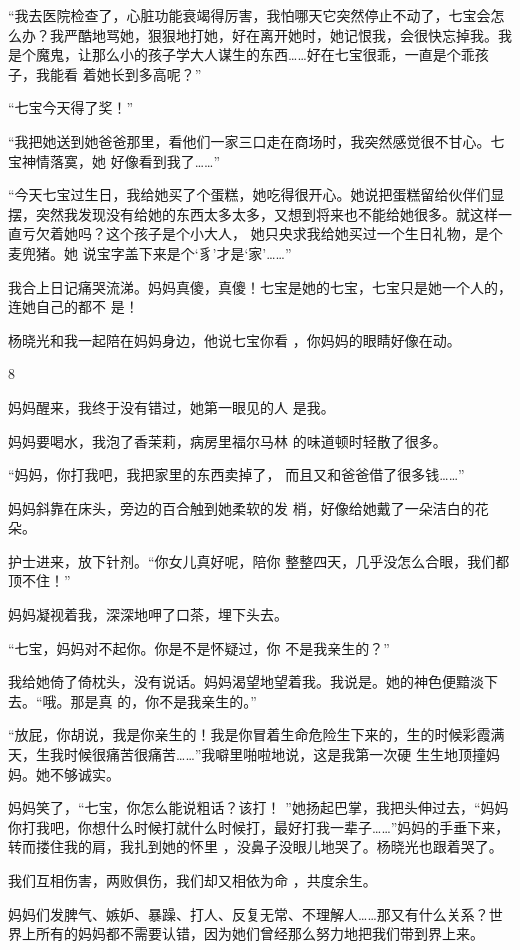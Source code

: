 \documentclass{article}
\begin{document}
“我去医院检查了，心脏功能衰竭得厉害，我怕哪天它突然停止不动了，七宝会怎么办？我严酷地骂她，狠狠地打她，好在离开她时，她记恨我，会很快忘掉我。我是个魔鬼，让那么小的孩子学大人谋生的东西……好在七宝很乖，一直是个乖孩子，我能看
着她长到多高呢？” 


“七宝今天得了奖！” 

“我把她送到她爸爸那里，看他们一家三口走在商场时，我突然感觉很不甘心。七宝神情落寞，她
好像看到我了……” 

“今天七宝过生日，我给她买了个蛋糕，她吃得很开心。她说把蛋糕留给伙伴们显摆，突然我发现没有给她的东西太多太多，又想到将来也不能给她很多。就这样一直亏欠着她吗？这个孩子是个小大人，
\newpage
她只央求我给她买过一个生日礼物，是个麦兜猪。她
说宝字盖下来是个‘豸’才是‘家’……” 

我合上日记痛哭流涕。妈妈真傻，真傻！七宝是她的七宝，七宝只是她一个人的，连她自己的都不
是！ 

杨晓光和我一起陪在妈妈身边，他说七宝你看
，你妈妈的眼睛好像在动。 


8 

妈妈醒来，我终于没有错过，她第一眼见的人
是我。 

妈妈要喝水，我泡了香茉莉，病房里福尔马林
的味道顿时轻散了很多。 

“妈妈，你打我吧，我把家里的东西卖掉了，
而且又和爸爸借了很多钱……” 

\newpage

妈妈斜靠在床头，旁边的百合触到她柔软的发
梢，好像给她戴了一朵洁白的花朵。 

护士进来，放下针剂。“你女儿真好呢，陪你
整整四天，几乎没怎么合眼，我们都顶不住！” 

妈妈凝视着我，深深地呷了口茶，埋下头去。

“七宝，妈妈对不起你。你是不是怀疑过，你
不是我亲生的？” 

我给她倚了倚枕头，没有说话。妈妈渴望地望着我。我说是。她的神色便黯淡下去。“哦。那是真
的，你不是我亲生的。” 

“放屁，你胡说，我是你亲生的！我是你冒着生命危险生下来的，生的时候彩霞满天，生我时候很痛苦很痛苦……”我噼里啪啦地说，这是我第一次硬
生生地顶撞妈妈。她不够诚实。 

妈妈笑了，“七宝，你怎么能说粗话？该打！
\newpage
”她扬起巴掌，我把头伸过去，“妈妈你打我吧，你想什么时候打就什么时候打，最好打我一辈子……”妈妈的手垂下来，转而搂住我的肩，我扎到她的怀里
，没鼻子没眼儿地哭了。杨晓光也跟着哭了。 

我们互相伤害，两败俱伤，我们却又相依为命
，共度余生。 

妈妈们发脾气、嫉妒、暴躁、打人、反复无常、不理解人……那又有什么关系？世界上所有的妈妈都不需要认错，因为她们曾经那么努力地把我们带到界上来。
\end{document}
